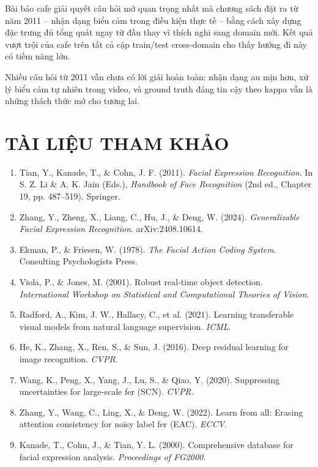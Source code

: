 \documentclass[12pt,a4paper]{article}
\begin{document}
Bài báo \gls{cafe} giải quyết câu hỏi mở quan trọng nhất mà chương sách đặt ra từ năm 2011 -- nhận dạng biểu cảm trong điều kiện thực tế -- bằng cách xây dựng đặc trưng đủ tổng quát ngay từ đầu thay vì thích nghi sang domain mới. Kết quả vượt trội của \gls{cafe} trên tất cả cặp train/test cross-domain cho thấy hướng đi này có tiềm năng lớn.

Nhiều câu hỏi từ 2011 vẫn chưa có lời giải hoàn toàn: nhận dạng \gls{au} mịn hơn, xử lý biểu cảm tự nhiên trong video, và ground truth đáng tin cậy theo \gls{kappa} vẫn là những thách thức mở cho tương lai.


\newpage
\section*{TÀI LIỆU THAM KHẢO}

\begin{enumerate}
    \item Tian, Y., Kanade, T., \& Cohn, J. F. (2011). \textit{Facial Expression Recognition}. In S. Z. Li \& A. K. Jain (Eds.), \textit{Handbook of Face Recognition} (2nd ed., Chapter 19, pp. 487--519). Springer.

    \item Zhang, Y., Zheng, X., Liang, C., Hu, J., \& Deng, W. (2024). \textit{Generalizable Facial Expression Recognition}. arXiv:2408.10614.

    \item Ekman, P., \& Friesen, W. (1978). \textit{The Facial Action Coding System}. Consulting Psychologists Press.

    \item Viola, P., \& Jones, M. (2001). Robust real-time object detection. \textit{International Workshop on Statistical and Computational Theories of Vision}.
    \label{viola2001}

    \item Radford, A., Kim, J. W., Hallacy, C., et al. (2021). Learning transferable visual models from natural language supervision. \textit{ICML}.

    \item He, K., Zhang, X., Ren, S., \& Sun, J. (2016). Deep residual learning for image recognition. \textit{CVPR}.

    \item Wang, K., Peng, X., Yang, J., Lu, S., \& Qiao, Y. (2020). Suppressing uncertainties for large-scale \gls{fer} (SCN). \textit{CVPR}.

    \item Zhang, Y., Wang, C., Ling, X., \& Deng, W. (2022). Learn from all: Erasing attention consistency for noisy label \gls{fer} (EAC). \textit{ECCV}.

    \item Kanade, T., Cohn, J., \& Tian, Y. L. (2000). Comprehensive database for facial expression analysis. \textit{Proceedings of FG2000}.
    \label{kanade2000}
\end{enumerate}
\end{document}
